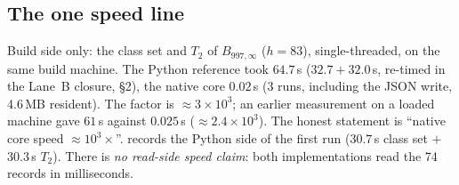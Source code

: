 \subsection{The one speed line}\label{ss:hacs-speed}
Build side only: the class set and $T_2$ of $B_{997,\infty}$ ($h=83$), single-threaded, on the same build machine. The
Python reference took $64.7$\,s ($32.7+32.0$\,s, re-timed in the Lane~B closure, \S2), the native core $0.02$\,s (3 runs,
including the JSON write, 4.6\,MB resident). The factor is $\approx3\times10^3$; an earlier measurement on a loaded machine
gave $61$\,s against $0.025$\,s ($\approx2.4\times10^3$). The honest statement is ``native core speed $\approx10^3\times$''.
 records the Python side of the first run ($30.7$\,s class set $+$ $30.3$\,s $T_2$). There is
\emph{no read-side speed claim}: both implementations read the 74 records in milliseconds.

